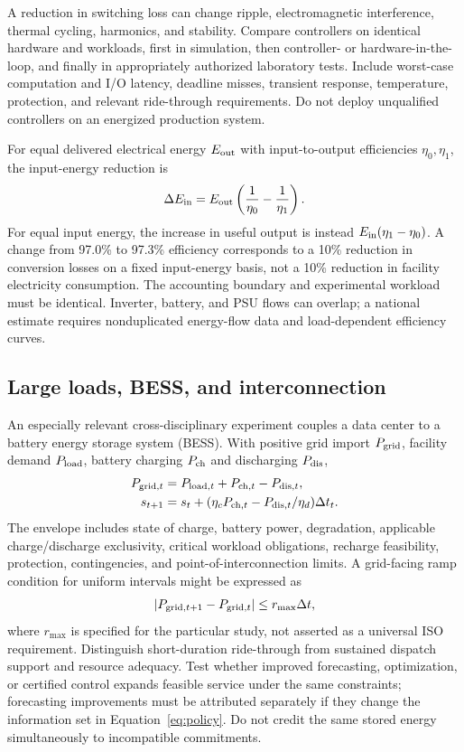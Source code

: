 \documentclass[11pt,letterpaper]{article}
\begin{document}
A reduction in switching loss can change ripple, electromagnetic interference, thermal cycling, harmonics, and stability. Compare controllers on identical hardware and workloads, first in simulation, then controller- or hardware-in-the-loop, and finally in appropriately authorized laboratory tests. Include worst-case computation and I/O latency, deadline misses, transient response, temperature, protection, and relevant ride-through requirements. Do not deploy unqualified controllers on an energized production system.

For equal delivered electrical energy $E_{\rm out}$ with input-to-output efficiencies $\eta_0,\eta_1$, the input-energy reduction is
\begin{equation}
\Delta E_{\rm in}=E_{\rm out}\left(\frac{1}{\eta_0}-\frac{1}{\eta_1}\right).
\end{equation}
For equal input energy, the increase in useful output is instead $E_{\rm in}(\eta_1-\eta_0)$. A change from 97.0\% to 97.3\% efficiency corresponds to a 10\% reduction in conversion losses on a fixed input-energy basis, not a 10\% reduction in facility electricity consumption. The accounting boundary and experimental workload must be identical. Inverter, battery, and PSU flows can overlap; a national estimate requires nonduplicated energy-flow data and load-dependent efficiency curves.

\subsection{Large loads, BESS, and interconnection}
An especially relevant cross-disciplinary experiment couples a data center to a battery energy storage system (BESS). With positive grid import $P_{\rm grid}$, facility demand $P_{\rm load}$, battery charging $P_{\rm ch}$ and discharging $P_{\rm dis}$,
\begin{align}
P_{{\rm grid},t}&=P_{{\rm load},t}+P_{{\rm ch},t}-P_{{\rm dis},t},\\
s_{t+1}&=s_t+(\eta_cP_{{\rm ch},t}-P_{{\rm dis},t}/\eta_d)\Delta t_t.
\end{align}
The envelope includes state of charge, battery power, degradation, applicable charge/discharge exclusivity, critical workload obligations, recharge feasibility, protection, contingencies, and point-of-interconnection limits. A grid-facing ramp condition for uniform intervals might be expressed as
\begin{equation}
|P_{{\rm grid},t+1}-P_{{\rm grid},t}|\leq r_{\max}\Delta t,
\end{equation}
where $r_{\max}$ is specified for the particular study, not asserted as a universal ISO requirement. Distinguish short-duration ride-through from sustained dispatch support and resource adequacy. Test whether improved forecasting, optimization, or certified control expands feasible service under the same constraints; forecasting improvements must be attributed separately if they change the information set in Equation~\ref{eq:policy}. Do not credit the same stored energy simultaneously to incompatible commitments.
\end{document}
